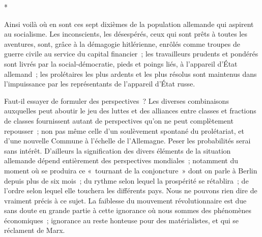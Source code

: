 \documentclass[french,twoside]{book} %
\begin{document}
\begin{center}
*\end{center}
\noindent Ainsi voilà où en sont ces sept dixièmes de la population allemande qui aspirent au socialisme. Les inconscients, les désespérés, ceux qui sont prêts à toutes les aventures, sont, grâce à la démagogie hitlérienne, enrôlés comme troupes de guerre civile au service du capital financier ; les travailleurs pru­dents et pondérés sont livrés par la social-démocratie, pieds et poings liés, à l'appareil d'État allemand ; les prolétaires les plus ardents et les plus résolus sont maintenus dans l'impuissance par les représentants de l'appareil d'État russe.\par
Faut-il essayer de formuler des perspectives ? Les diverses combinaisons auxquelles peut aboutir le jeu des luttes et des alliances entre classes et frac­tions de classes fournissent autant de perspectives qu'on ne peut complètement repousser ; non pas même celle d'un soulèvement spontané du prolétariat, et d'une nouvelle Commune à l'échelle de l'Allemagne. Peser les probabilités serai sans intérêt. D'ailleurs la signification des divers éléments de la situation allemande dépend entièrement des perspectives mondiales ; notamment du moment où se produira ce « tournant de la conjoncture » dont on parle à Berlin depuis plus de six mois ; du rythme selon lequel la prospérité se réta­blira ; de l'ordre selon lequel elle touchera les différents pays. Nous ne pouvons rien dire de vraiment précis à ce sujet. La faiblesse du mouvement révolutionnaire est due sans doute en grande partie à cette ignorance où nous sommes des phénomènes économiques ; ignorance au reste honteuse pour des matérialistes, et qui se réclament de Marx.\par
\end{document}

